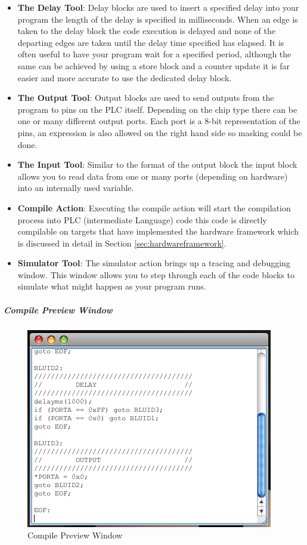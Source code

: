 \begin{itemize}
\item \textbf{The Delay Tool}: Delay blocks are used to insert a specified delay into your program the length of the delay is specified in milliseconds. When an edge is taken to the delay block the code execution is delayed and none of the departing edges are taken until the delay time specified has elapsed. It is often useful to have your program wait for a specified period, although the same can be achieved by using a store block and a counter update it is far easier and more accurate to use the dedicated delay block.

\item \textbf{The Output Tool}: Output blocks are used to send outputs from the program to pins on the PLC itself. Depending on the chip type there can be one or many different output ports. Each port is a 8-bit representation of the pins, an expression is also allowed on the right hand side so masking could be done.

\item \textbf{The Input Tool}: Similar to the format of the output block the input block allows you to read data from one or many ports (depending on hardware) into an internally used variable.

\item \textbf{Compile Action}: Executing the compile action will start the compilation process into PLC  (intermediate Language) code this code is directly compilable on targets that have implemented the hardware framework which is discussed in detail in Section \ref{sec:hardwareframework}.

\item \textbf{Simulator Tool}: The simulator action brings up a tracing and debugging window. This window allows you to step through each of the code blocks to simulate what might happen as your program runs.
\end{itemize}

\subparagraph{Compile Preview Window}

\begin{figure}[htp]
    \centering
    \includegraphics[width=\imgmedium]{./images/plcedit_compile.png}
    \caption{Compile Preview Window}
    \label{fig:plcedit_compile}
\end{figure}

